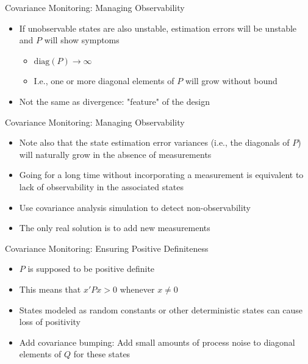 \begin{frame}
Covariance Monitoring:  Managing Observability
\begin{itemize}
  \item If unobservable states are also unstable, estimation errors will be unstable and $P$ will show symptoms 
\begin{itemize}
  \item $\text{diag}(P)\rightarrow \infty$
  \item I.e., one or more diagonal elements of $P$ will grow without bound
\end{itemize}
  \item Not the same as divergence: "feature" of the design
\end{itemize}
\end{frame}
\begin{frame}
Covariance Monitoring:  Managing Observability
\begin{itemize}
  \item Note also that the state estimation error variances (i.e., the diagonals of $P$) will naturally grow in the absence of measurements
  \item Going for a long time without incorporating a measurement is equivalent to lack of observability in the associated states
  \item Use covariance analysis simulation to detect non-observability
  \item The only real solution is to add new measurements
\end{itemize}
\end{frame}
\begin{frame}
Covariance Monitoring:  Ensuring Positive Definiteness
\begin{itemize}
  \item $P$ is supposed to be positive definite
  \item This means that $x'Px>0$ whenever $x\neq0$
  \item States modeled as random constants or other deterministic states can cause loss of positivity
  \item Add covariance bumping:  Add small amounts of process noise to diagonal elements of $Q$ for these states
\end{itemize}
\end{frame}
